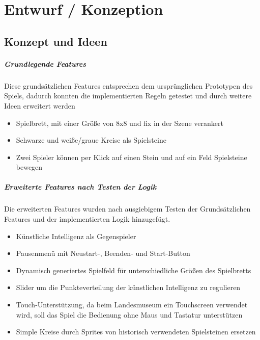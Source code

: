 
\chapter{Entwurf / Konzeption}
\label{ch:Entwurf}



\section{Konzept und Ideen}
\label{ch:Entwurf:sec:1.Konzept}
\paragraph{Grundlegende Features}
 Diese grundsätzlichen Features entsprechen dem ursprünglichen Prototypen des Spiels, dadurch konnten die implementierten Regeln getestet und durch weitere Ideen erweitert werden
 	\begin{itemize}
 		\item Spielbrett, mit einer Größe von 8x8 und fix in der Szene verankert
 		\item Schwarze und weiße/graue Kreise als Spielsteine
 		\item Zwei Spieler können per Klick auf einen Stein und auf ein Feld Spielsteine bewegen
 	\end{itemize}

 \paragraph{Erweiterte Features nach Testen der Logik}
 Die erweiterten Features wurden nach ausgiebigem Testen der Grundsätzlichen Features und der implementierten Logik hinzugefügt.
 \begin{itemize}
 \item Künstliche Intelligenz als Gegenspieler
 \item Pausenmenü mit Neustart-, Beenden- und Start-Button
 \item Dynamisch generiertes Spielfeld für unterschiedliche Größen des Spielbretts
 \item Slider um die Punkteverteilung der künstlichen Intelligenz zu regulieren
 \item Touch-Unterstützung, da beim Landesmuseum ein Touchscreen verwendet wird, soll das Spiel die Bedienung ohne Maus und Tastatur unterstützen
 \item Simple Kreise durch Sprites von historisch verwendeten Spielsteinen ersetzen
\end{itemize}


